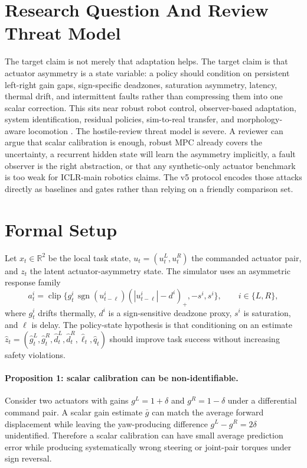 \documentclass{article}
\begin{document}
\section{Research Question And Review Threat Model}
The target claim is not merely that adaptation helps. The target claim is that actuator asymmetry is a state variable: a policy should condition on persistent left-right gain gaps, sign-specific deadzones, saturation asymmetry, latency, thermal drift, and intermittent faults rather than compressing them into one scalar correction. This sits near robust robot control, observer-based adaptation, system identification, residual policies, sim-to-real transfer, and morphology-aware locomotion \citep{pool86_01,pool86_02,pool86_03,pool86_04,pool86_05,pool86_06}.
The hostile-review threat model is severe. A reviewer can argue that scalar calibration is enough, robust MPC already covers the uncertainty, a recurrent hidden state will learn the asymmetry implicitly, a fault observer is the right abstraction, or that any synthetic-only actuator benchmark is too weak for ICLR-main robotics claims. The v5 protocol encodes those attacks directly as baselines and gates rather than relying on a friendly comparison set.
\section{Formal Setup}
Let $x_t\in\mathbb{R}^2$ be the local task state, $u_t=(u^L_t,u^R_t)$ the commanded actuator pair, and $z_t$ the latent actuator-asymmetry state. The simulator uses an asymmetric response family
\begin{equation}
a^i_t = \operatorname{clip}\{g^i_t\,\operatorname{sgn}(u^i_{t-\ell})(|u^i_{t-\ell}|-d^i)_+, -s^i, s^i\},\qquad i\in\{L,R\},
\end{equation}
where $g^i_t$ drifts thermally, $d^i$ is a sign-sensitive deadzone proxy, $s^i$ is saturation, and $\ell$ is delay. The policy-state hypothesis is that conditioning on an estimate $\hat z_t=(\hat g^L_t,\hat g^R_t,\hat d^L_t,\hat d^R_t,\hat\ell_t,\hat q_t)$ should improve task success without increasing safety violations.
\paragraph{Proposition 1: scalar calibration can be non-identifiable.}
Consider two actuators with gains $g^L=1+\delta$ and $g^R=1-\delta$ under a differential command pair. A scalar gain estimate $\bar g$ can match the average forward displacement while leaving the yaw-producing difference $g^L-g^R=2\delta$ unidentified. Therefore a scalar calibration can have small average prediction error while producing systematically wrong steering or joint-pair torques under sign reversal.
\end{document}
